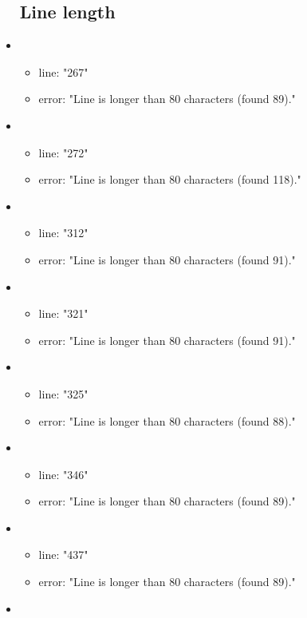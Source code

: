 \begin{itemize}
\subsection{Line length} %
\label{sub:line_length}
	\item 
	\begin{itemize} 
		\item line: "267" 
		\item error: "Line is longer than 80 characters (found 89)." 
	\end{itemize}
	\item 
	\begin{itemize} 
		\item line: "272" 
		\item error: "Line is longer than 80 characters (found 118)." 
	\end{itemize}
	\item 
	\begin{itemize} 
		\item line: "312" 
		\item error: "Line is longer than 80 characters (found 91)." 
	\end{itemize}
	\item 
	\begin{itemize} 
		\item line: "321" 
		\item error: "Line is longer than 80 characters (found 91)." 
	\end{itemize}
	\item 
	\begin{itemize} 
		\item line: "325" 
		\item error: "Line is longer than 80 characters (found 88)." 
	\end{itemize}
	\item 
	\begin{itemize} 
		\item line: "346" 
		\item error: "Line is longer than 80 characters (found 89)." 
	\end{itemize}
	\item 
	\begin{itemize} 
		\item line: "437" 
		\item error: "Line is longer than 80 characters (found 89)." 
	\end{itemize}
	\item 
	\begin{itemize} 

\end{itemize}
\end{itemize}
